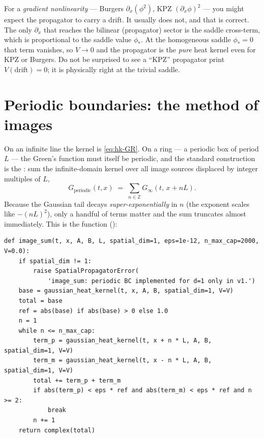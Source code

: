\begin{gotcha}
For a \emph{gradient nonlinearity} --- Burgers $\partial_x(\phi^{2})$, KPZ
$(\partial_x\phi)^{2}$ --- you might expect the propagator to carry a drift. It
usually does not, and that is correct. The only $\partial_x$ that reaches the
bilinear (propagator) sector is the saddle cross-term, which is proportional to
the saddle value $\phi_*$. At the homogeneous saddle $\phi_*=0$ that term
vanishes, so $V\to 0$ and the propagator is the \emph{pure} heat kernel even for
KPZ or Burgers. Do not be surprised to see a ``KPZ'' propagator print
$V(\text{drift})=0$; it is physically right at the trivial saddle.
\end{gotcha}

\section{Periodic boundaries: the method of images}\label{sec:hk-images}

On an infinite line the kernel is \eqref{eq:hk-GR}. On a ring --- a periodic box
of period $L$ --- the Green's function must itself be periodic, and the standard
construction is the : sum the infinite-domain kernel over
all image sources displaced by integer multiples of $L$,
\begin{equation}
  G_{\text{periodic}}(t,x) \;=\; \sum_{n\in\mathbb{Z}} G_{\infty}(t,\,x + nL).
  \label{eq:hk-imagesum}
\end{equation}
Because the Gaussian tail decays \emph{super-exponentially} in $n$ (the exponent
scales like $-(nL)^{2}$), only a handful of terms matter and the sum truncates
almost immediately. This is the function 
():

\begin{lstlisting}
def image_sum(t, x, A, B, L, spatial_dim=1, eps=1e-12, n_max_cap=2000, V=0.0):
    if spatial_dim != 1:
        raise SpatialPropagatorError(
            'image_sum: periodic BC implemented for d=1 only in v1.')
    base = gaussian_heat_kernel(t, x, A, B, spatial_dim=1, V=V)
    total = base
    ref = abs(base) if abs(base) > 0 else 1.0
    n = 1
    while n <= n_max_cap:
        term_p = gaussian_heat_kernel(t, x + n * L, A, B, spatial_dim=1, V=V)
        term_m = gaussian_heat_kernel(t, x - n * L, A, B, spatial_dim=1, V=V)
        total += term_p + term_m
        if abs(term_p) < eps * ref and abs(term_m) < eps * ref and n >= 2:
            break
        n += 1
    return complex(total)
\end{lstlisting}

